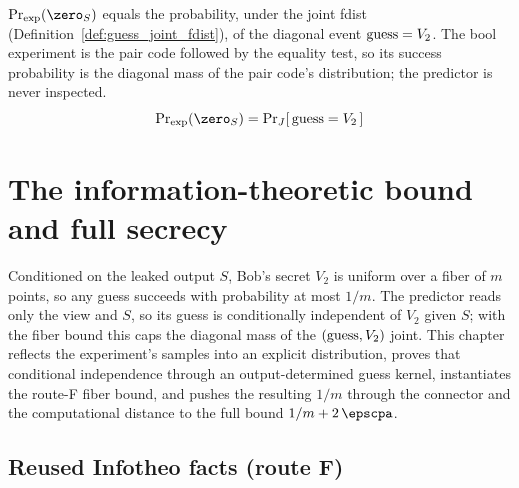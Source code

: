 \begin{lemma}
  \label{lem:guess_success_sdistr_eq_fdist}
  \rocqok
  $\Prexp(\zero_S)$ equals the probability, under the joint fdist
  (Definition~\ref{def:guess_joint_fdist}), of the diagonal event
  $\mathrm{guess} = V_2$. The bool experiment is the pair code followed by the equality
  test, so its success probability is the diagonal mass of the pair code's
  distribution; the predictor is never inspected.
  \[ \Prexp(\zero_S) = \Pr\nolimits_{\jointfdist}[\,\guess = V_2\,] \]
\end{lemma}

\chapter{The information-theoretic bound and full secrecy}
\label{ch:it_bound}

Conditioned on the leaked output $S$, Bob's secret $V_2$ is uniform over a fiber
of $m$ points, so any guess succeeds with probability at most $1/m$. The
predictor reads only the view and $S$, so its guess is conditionally independent
of $V_2$ given $S$; with the fiber bound this caps the diagonal mass of the
$(\mathrm{guess},V_2)$ joint. This chapter reflects the experiment's samples into an
explicit distribution, proves that conditional independence through an
output-determined guess kernel, instantiates the route-F fiber bound, and pushes
the resulting $1/m$ through the connector and the computational distance to the
full bound $1/m + 2\,\epscpa$.

\section{Reused Infotheo facts (route F)}

